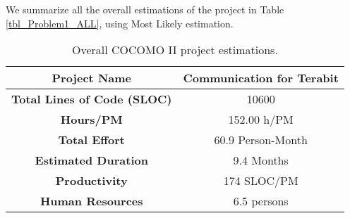 We summarize all the overall estimations of the project in Table \ref{tbl_Problem1_ALL}, using Most Likely estimation.

\begin{table}[hbtp]
\centering
\begin{tabular}{|c|c|} \hline
\textbf{Project Name} & {Communication for Terabit} \\ \hline
\textbf{Total Lines of Code (SLOC)} & {10600} \\ \hline
\textbf{Hours/PM} & {152.00 h/PM} \\ \hline
\textbf{Total Effort} & {60.9 Person-Month} \\ \hline
\textbf{Estimated Duration} & {9.4 Months} \\ \hline
\textbf{Productivity} & {174 SLOC/PM} \\ \hline
\textbf{Human Resources} & 6.5 persons \\ \hline
\end{tabular}
\label{tbl_Problem2_ALL}
\caption{Overall COCOMO II project estimations.}
\end{table}
